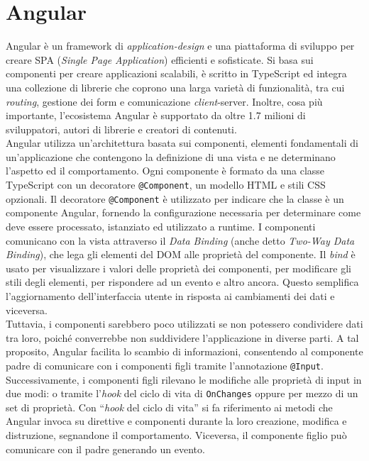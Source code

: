 \section{Angular}

Angular è un framework di \textit{application-design} e una piattaforma di sviluppo per creare SPA (\textit{Single Page Application}) efficienti e sofisticate. Si basa sui componenti per creare applicazioni scalabili, è scritto in TypeScript ed integra una collezione di librerie che coprono una larga varietà di funzionalità, tra cui \textit{routing}, gestione dei form e comunicazione \textit{client}-server. Inoltre, cosa più importante, l'ecosistema Angular è supportato da oltre 1.7 milioni di sviluppatori, autori di librerie e creatori di contenuti.\cite{ANGULAR_angular}\cite{ANGULAR_dariopironi}\\
Angular utilizza un’architettura basata sui componenti, elementi fondamentali di un’applicazione che contengono la definizione di una vista e ne determinano l’aspetto ed il comportamento. Ogni componente è formato da una classe TypeScript con un decoratore \texttt{@Component}, un modello HTML e stili CSS opzionali.\cite{ANGULAR_angular} Il decoratore \texttt{@Component} è utilizzato per indicare che la classe è un componente Angular, fornendo la configurazione necessaria per determinare come deve essere processato, istanziato ed utilizzato a runtime. I componenti comunicano con la vista attraverso il \textit{Data Binding} (anche detto \textit{Two-Way Data Binding}), che lega gli elementi del DOM alle proprietà del componente. Il \textit{bind} è usato per visualizzare i valori delle proprietà dei componenti, per modificare gli stili degli elementi, per rispondere ad un evento e altro ancora. Questo semplifica l’aggiornamento dell’interfaccia utente in risposta ai cambiamenti dei dati e viceversa.\cite{ANGULAR_dariopironi}\\
Tuttavia, i componenti sarebbero poco utilizzati se non potessero condividere dati tra loro, poiché converrebbe non suddividere l’applicazione in diverse parti. A tal proposito, Angular facilita lo scambio di informazioni, consentendo al componente padre di comunicare con i componenti figli tramite l’annotazione \texttt{@Input}. Successivamente, i componenti figli rilevano le modifiche alle proprietà di input in due modi: o tramite l’\textit{hook} del ciclo di vita di \texttt{OnChanges} oppure per mezzo di un set di proprietà. Con “\textit{hook} del ciclo di vita” si fa riferimento ai metodi che Angular invoca su direttive e componenti durante la loro creazione, modifica e distruzione, segnandone il comportamento. Viceversa, il componente figlio può comunicare con il padre generando un evento.\cite{ANGULAR_angular2}\\
